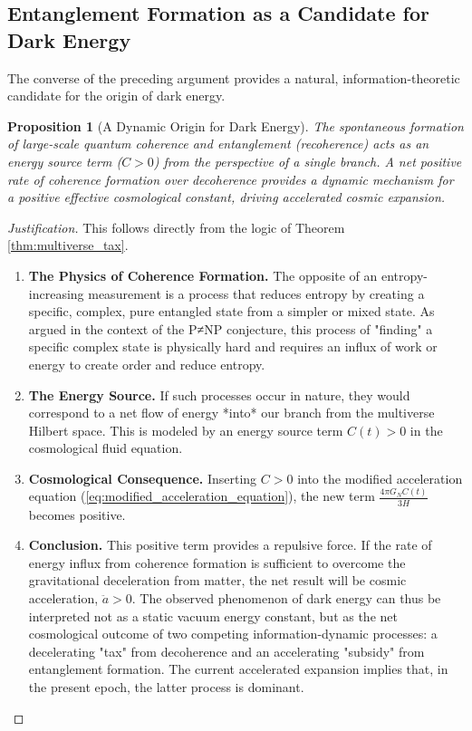 \documentclass[11pt, letterpaper]{report}
\theoremstyle{plain} %
\newtheorem{proposition}[theorem]{Proposition}
\theoremstyle{definition} %
\theoremstyle{remark} %
\begin{document}
\subsection{Entanglement Formation as a Candidate for Dark Energy}
\label{subsec:explore_dark_energy}

The converse of the preceding argument provides a natural, information-theoretic candidate for the origin of dark energy.

\begin{proposition}[A Dynamic Origin for Dark Energy]
\label{prop:explore_dark_energy}
The spontaneous formation of large-scale quantum coherence and entanglement (recoherence) acts as an energy source term ($C > 0$) from the perspective of a single branch. A net positive rate of coherence formation over decoherence provides a dynamic mechanism for a positive effective cosmological constant, driving accelerated cosmic expansion.
\end{proposition}
\begin{proof}[Justification]
This follows directly from the logic of Theorem \ref{thm:multiverse_tax}.
\begin{enumerate}
    \item \textbf{The Physics of Coherence Formation.} The opposite of an entropy-increasing measurement is a process that reduces entropy by creating a specific, complex, pure entangled state from a simpler or mixed state. As argued in the context of the P≠NP conjecture, this process of "finding" a specific complex state is physically hard and requires an influx of work or energy to create order and reduce entropy.
    \item \textbf{The Energy Source.} If such processes occur in nature, they would correspond to a net flow of energy *into* our branch from the multiverse Hilbert space. This is modeled by an energy source term $C(t) > 0$ in the cosmological fluid equation.
    \item \textbf{Cosmological Consequence.} Inserting $C > 0$ into the modified acceleration equation (\cref{eq:modified_acceleration_equation}), the new term $\frac{4\pi G_N C(t)}{3H}$ becomes positive.
    \item \textbf{Conclusion.} This positive term provides a repulsive force. If the rate of energy influx from coherence formation is sufficient to overcome the gravitational deceleration from matter, the net result will be cosmic acceleration, $\ddot{a}>0$. The observed phenomenon of dark energy can thus be interpreted not as a static vacuum energy constant, but as the net cosmological outcome of two competing information-dynamic processes: a decelerating "tax" from decoherence and an accelerating "subsidy" from entanglement formation. The current accelerated expansion implies that, in the present epoch, the latter process is dominant.
\end{enumerate}
\end{proof}
\end{document}
